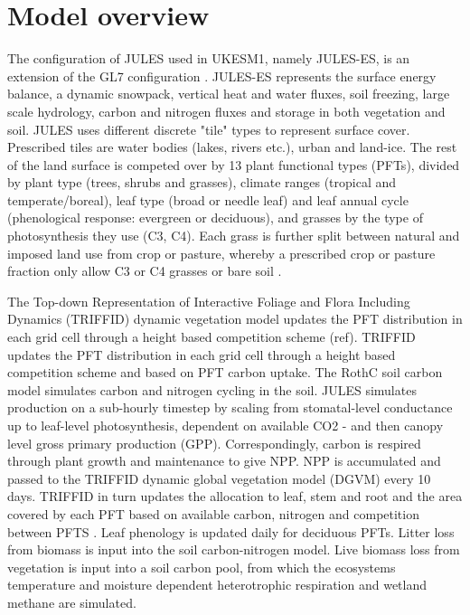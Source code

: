 \documentclass[bg, manuscript]{copernicus}
\begin{document}
\section{Model overview}

The configuration of JULES used in UKESM1, namely JULES-ES, is an extension of the GL7 configuration \citep{wiltshire2020gl7}. JULES-ES represents the surface energy balance, a dynamic snowpack, vertical heat and water fluxes, soil freezing, large scale hydrology, carbon and nitrogen fluxes and storage in both vegetation and soil. JULES uses different discrete "tile" types to represent surface cover. Prescribed tiles are water bodies (lakes, rivers etc.), urban and land-ice. The rest of the land surface is competed over by 13 plant functional types (PFTs), divided by plant type (trees, shrubs and grasses), climate ranges (tropical and temperate/boreal), leaf type (broad or needle leaf) and leaf annual cycle (phenological response: evergreen or deciduous), and grasses by the type of photosynthesis they use (C3, C4). Each grass is further split between natural and imposed land use from crop or pasture, whereby a prescribed crop or pasture fraction only allow C3 or C4 grasses or bare soil \citep{robertson2019local}.

The Top-down Representation of Interactive Foliage and Flora Including Dynamics (TRIFFID) dynamic vegetation model updates the PFT distribution in each grid cell through a height based competition scheme (ref). TRIFFID updates the PFT distribution in each grid cell through a height based competition scheme \citep{harper2016improved} and based on PFT carbon uptake. The RothC soil carbon model \cite{clark2011joint} simulates carbon and nitrogen cycling in the soil. JULES simulates production on a sub-hourly timestep by scaling from stomatal-level conductance up to leaf-level photosynthesis, dependent on available CO2 - and then canopy level gross primary production (GPP). Correspondingly, carbon is respired through plant growth and maintenance to give NPP.  NPP is accumulated and passed to the TRIFFID dynamic global vegetation model (DGVM) every 10 days. TRIFFID in turn updates the allocation to leaf, stem and root and the area covered by each PFT based on available carbon, nitrogen and competition between PFTS \citep{wiltshire2020jules}. Leaf phenology is updated daily for deciduous PFTs.  Litter loss from biomass is input into the soil carbon-nitrogen model. Live biomass loss from vegetation is input into a soil carbon pool, from which the ecosystems temperature and moisture dependent heterotrophic respiration and wetland methane are simulated.
\end{document}
